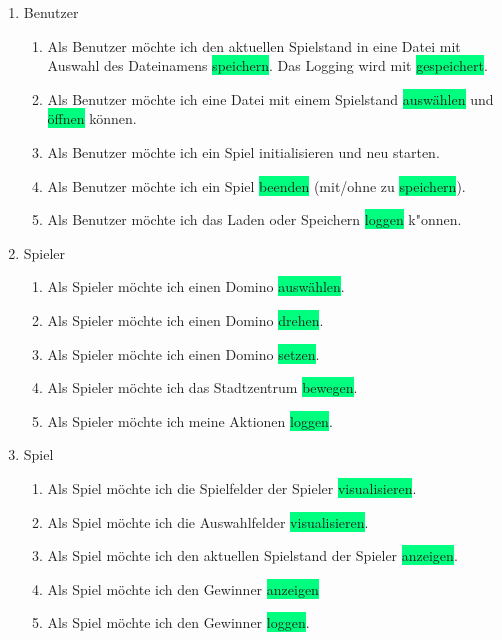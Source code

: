 \begin{enumerate}
	\item Benutzer
	\begin{enumerate}
		\item Als \colorbox{Apricot}{Benutzer} möchte ich den aktuellen Spielstand in eine Datei mit Auswahl des Dateinamens \colorbox{SpringGreen}{speichern}. Das Logging wird mit \colorbox{SpringGreen}{gespeichert}.
		\item Als \colorbox{Apricot}{Benutzer} möchte ich eine Datei mit einem Spielstand  \colorbox{SpringGreen}{auswählen} und \colorbox{SpringGreen}{öffnen} können.
		\item Als \colorbox{Apricot}{Benutzer} möchte ich ein \colorbox{Apricot}{Spiel} initialisieren und neu starten.
		\item Als \colorbox{Apricot}{Benutzer} möchte ich ein \colorbox{Apricot}{Spiel} \colorbox{SpringGreen}{beenden} (mit/ohne zu \colorbox{SpringGreen}{speichern}).
		\item Als \colorbox{Apricot}{Benutzer} möchte ich das Laden oder Speichern  \colorbox{SpringGreen}{loggen} k"onnen.
	\end{enumerate}	
	\item Spieler
	\begin{enumerate}
		\item Als \colorbox{Apricot}{Spieler} möchte ich einen \colorbox{Apricot}{Domino} \colorbox{SpringGreen}{auswählen}.
 		\item Als \colorbox{Apricot}{Spieler} möchte ich einen \colorbox{Apricot}{Domino} \colorbox{SpringGreen}{drehen}.
		\item Als \colorbox{Apricot}{Spieler} möchte ich einen \colorbox{Apricot}{Domino} \colorbox{SpringGreen}{setzen}.
		\item Als \colorbox{Apricot}{Spieler} möchte ich das Stadtzentrum \colorbox{SpringGreen}{bewegen}.
		\item Als \colorbox{Apricot}{Spieler} möchte ich meine Aktionen \colorbox{SpringGreen}{loggen}.
	\end{enumerate}
	\item Spiel
	\begin{enumerate}
		\item Als \colorbox{Apricot}{Spiel} möchte ich die \colorbox{Apricot}{Spielfelder} der Spieler \colorbox{SpringGreen}{visualisieren}.
		\item Als \colorbox{Apricot}{Spiel} möchte ich die \colorbox{Apricot}{Auswahlfelder} \colorbox{SpringGreen}{visualisieren}.
		\item Als \colorbox{Apricot}{Spiel} möchte ich den \colorbox{Apricot}{aktuellen Spielstand} der Spieler \colorbox{SpringGreen}{anzeigen}.
		\item Als \colorbox{Apricot}{Spiel} möchte ich den \colorbox{Apricot}{Gewinner} \colorbox{SpringGreen}{anzeigen}
		\item Als \colorbox{Apricot}{Spiel} möchte ich den \colorbox{Apricot}{Gewinner} \colorbox{SpringGreen}{loggen}.
	\end{enumerate}
\end{enumerate}

